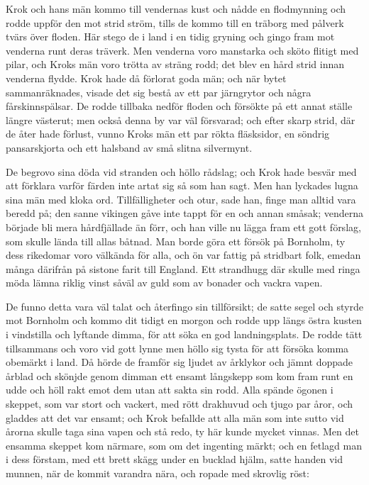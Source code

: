 \initial Krok och hans män kommo till vendernas kust och nådde en flodmynning och rodde uppför den mot strid ström, tills de kommo till en träborg med pålverk tvärs över floden. Här stego de i land i en tidig gryning och gingo fram mot venderna runt deras träverk. Men venderna voro manstarka och sköto flitigt med pilar, och Kroks män voro trötta av sträng rodd; det blev en hård strid innan venderna flydde. Krok hade då förlorat goda män; och när bytet sammanräknades, visade det sig bestå av ett par järngrytor och några fårskinnspälsar. De rodde tillbaka nedför floden och försökte på ett annat ställe längre västerut; men också denna by var väl försvarad; och efter skarp strid, där de åter hade förlust, vunno Kroks män ett par rökta fläsksidor, en söndrig pansarskjorta och ett halsband av små slitna silvermynt.

\initial De begrovo sina döda vid stranden och höllo rådslag; och Krok hade besvär med att förklara varför färden inte artat sig så som han sagt. Men han lyckades lugna sina män med kloka ord. Tillfälligheter och otur, sade han, finge man alltid vara beredd på; den sanne vikingen gåve inte tappt för en och annan småsak; venderna började bli mera hårdfjällade än förr, och han ville nu lägga fram ett gott förslag, som skulle lända till allas båtnad. Man borde göra ett försök på Bornholm, ty dess rikedomar voro välkända för alla, och ön var fattig på stridbart folk, emedan många därifrån på sistone farit till England. Ett strandhugg där skulle med ringa möda lämna riklig vinst såväl av guld som av bonader och vackra vapen.

\initial De funno detta vara väl talat och återfingo sin tillförsikt; de satte segel och styrde mot Bornholm och kommo dit tidigt en morgon och rodde upp längs östra kusten i vindstilla och lyftande dimma, för att söka en god landningsplats. De rodde tätt tillsammans och voro vid gott lynne men höllo sig tysta för att försöka komma obemärkt i land. Då hörde de framför sig ljudet av årklykor och jämnt doppade årblad och skönjde genom dimman ett ensamt långskepp som kom fram runt en udde och höll rakt emot dem utan att sakta sin rodd. Alla spände ögonen i skeppet, som var stort och vackert, med rött drakhuvud och tjugo par åror, och gladdes att det var ensamt; och Krok befallde att alla män som inte sutto vid årorna skulle taga sina vapen och stå redo, ty här kunde mycket vinnas. Men det ensamma skeppet kom närmare, som om det ingenting märkt; och en fetlagd man i dess förstam, med ett brett skägg under en bucklad hjälm, satte handen vid munnen, när de kommit varandra nära, och ropade med skrovlig röst:

